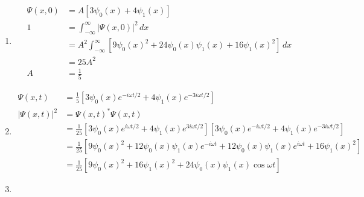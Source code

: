 \documentclass{article}
\begin{document}
\begin{enumerate}
  \item

        \begin{align*}
          \Psi(x, 0) & = A [3 \psi_0(x) + 4 \psi_1(x)]                                                             \\
          1          & = \int_{-\infty}^\infty |\Psi(x, 0)|^2 \,d x                                                \\
                     & = A^2 \int_{-\infty}^\infty [9 \psi_0(x)^2 + 24 \psi_0(x) \psi_1(x) + 16 \psi_1(x)^2] \,d x \\
                     & = 25 A^2                                                                                    \\
          A          & = \frac{1}{5}
        \end{align*}

  \item

        \begin{align*}
          \Psi(x, t)     & = \frac{1}{5} [3 \psi_0(x) e^{-i \omega t / 2} + 4 \psi_1(x) e^{-3 i \omega t / 2}]                                                                      \\
          |\Psi(x, t)|^2 & = \Psi(x, t)^* \Psi(x, t)                                                                                                                                \\
                         & = \frac{1}{25} [3 \psi_0(x) e^{i \omega t / 2} + 4 \psi_1(x) e^{3 i \omega t / 2}] [3 \psi_0(x) e^{-i \omega t / 2} + 4 \psi_1(x) e^{-3 i \omega t / 2}] \\
                         & = \frac{1}{25} [9 \psi_0(x)^2 + 12 \psi_0(x) \psi_1(x) e^{-i \omega t} + 12 \psi_0(x) \psi_1(x) e^{i \omega t} + 16 \psi_1(x)^2]                         \\
                         & = \frac{1}{25} [9 \psi_0(x)^2 + 16 \psi_1(x)^2 + 24 \psi_0(x) \psi_1(x) \cos \omega t]
        \end{align*}

  \item


\end{enumerate}
\end{document}
